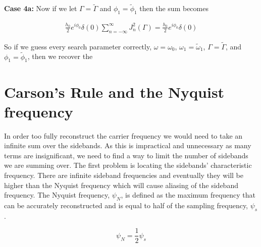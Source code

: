 \documentclass[onecolumn, groupedaddress, 10pt]{revtex4-1}
\begin{document}
\textbf{Case 4a:} Now if we let $\Gamma = \widetilde{\Gamma}$ and $\phi_1 = \widetilde{\phi}_1$ then the sum becomes

\begin{align}
\frac{h_0}{2} e^{i\phi_0} \delta(0) \sum_{n=-\infty}^{\infty} J_n^2 (\Gamma) = \frac{h_0}{2} e^{i\phi_0} \delta(0)
\end{align}

So if we guess every search parameter correctly, $\omega = \omega_0$, $\omega_1 = \widetilde{\omega}_1$, $\Gamma = \widetilde{\Gamma}$, and $\phi_1 = \widetilde{\phi}_1$, then we recover the 







\section{Carson's Rule and the Nyquist frequency}
In order too fully reconstruct the carrier frequency we would need to take an infinite sum over the sidebands. As this is impractical and unnecessary as many terms are insignificant, we need to find a way to limit the number of sidebands we are summing over. The first problem is locating the sidebands' characteristic frequency. There are infinite sideband frequencies and eventually they will be higher than the Nyquist frequency which will cause aliasing of the sideband frequency. The Nyquist frequency, $\psi_N$, is defined as the maximum frequency that can be accurately reconstructed and is equal to half of the sampling frequency, $\psi_s$.

\begin{equation}
\psi_N = \frac{1}{2}\psi_s
\end{equation}
\end{document}
